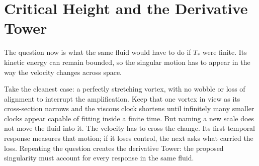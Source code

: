 \section{Critical Height and the Derivative Tower}\label{sec:CriticalHeightAndDerivativeTower}

The question now is what the same fluid would have to do if \(T_*\) were
finite.  Its kinetic energy can remain bounded, so the singular motion has to
appear in the way the velocity changes across space.

Take the cleanest case: a perfectly stretching vortex, with no wobble or loss
of alignment to interrupt the amplification.  Keep that one vortex in view as
its cross-section narrows and the viscous clock shortens until infinitely many
smaller clocks appear capable of fitting inside a finite time.  But naming a
new scale does not move the fluid into it.  The velocity has to cross the
change.  Its first temporal response measures that motion; if it loses control,
the next asks what carried the loss.  Repeating the question creates the
derivative Tower: the proposed singularity must account for every response in
the same fluid.



